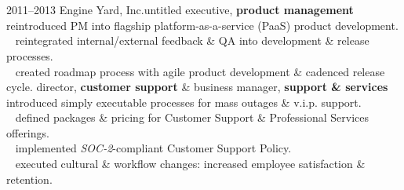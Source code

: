 \documentclass[]{friggeri-cv} %
\begin{document}
\section{{}{} {\normalsize{}~~}}

\begin{entrylist}
\entry
{2011--2013}
{Engine Yard, Inc.}{untitled executive, \textbf{\color{DarkGray}product management}}
{{\tiny {}} ~ reintroduced PM into flagship platform-as-a-service (PaaS) product development.\\
{\tiny {}} ~ reintegrated internal/external feedback \& QA into development \& release processes.\\
{\tiny {}} ~ created roadmap process with agile product development \& cadenced release cycle.}
\entry
{}{}{director, \textbf{\color{DarkGray}customer support} \& business manager, \textbf{\color{DarkGray}support \& services}}
{{\tiny {}} ~ introduced simply executable processes for mass outages \& v.i.p. support.\\
{\tiny {}} ~ defined packages \& pricing for Customer Support \& Professional Services offerings.\\
{\tiny {}} ~ implemented \emph{SOC-2}-compliant Customer Support Policy.\\

{\tiny {}} ~ executed cultural \& workflow changes: increased employee satisfaction \& retention.\\

}
\end{entrylist}
\end{document}

